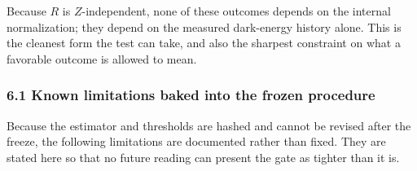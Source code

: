 \documentclass[
]{article}
\newcounter{none} %
\begin{document}
Because \(R\) is \(Z\)-independent, none of these outcomes depends on
the internal normalization; they depend on the measured dark-energy
history alone. This is the cleanest form the test can take, and also the
sharpest constraint on what a favorable outcome is allowed to mean.

\subsubsection{6.1 Known limitations baked into the frozen
procedure}\label{known-limitations-baked-into-the-frozen-procedure}

Because the estimator and thresholds are hashed and cannot be revised
after the freeze, the following limitations are documented rather than
fixed. They are stated here so that no future reading can present the
gate as tighter than it is.
\end{document}
